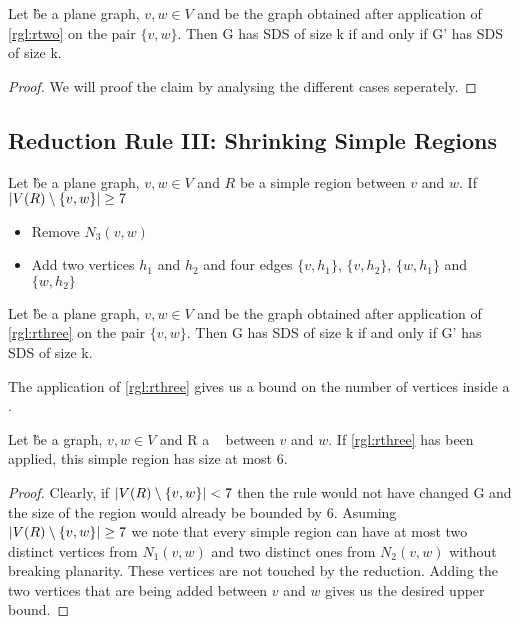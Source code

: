 \begin{lemma}
    Let \G be a plane graph, $v, w \in V$ and \GB be the graph obtained after application of \cref{rgl:rtwo} on the pair $\{v, w\}$. Then G has SDS of size k if and only if G' has SDS of size k.
\end{lemma}
\begin{proof}
   We will proof the claim by analysing the different cases seperately.
\end{proof}

\subsection{Reduction Rule III: Shrinking Simple Regions}
\begin{rgl}\label{rgl:rthree}
    Let \G be a plane graph, $v, w \in V$ and $R$ be a simple region between $v$ and $w$. If $\abs{V(R) \setminus \{v, w\}} \geq 7$
    \begin{itemize}
        \item Remove $N_3(v,w)$
        \item Add two vertices $h_1$ and $h_2$ and four edges $\{v, h_1\}$, $\{v, h_2\}$, $\{w, h_1\}$ and $\{w, h_2\}$
    \end{itemize}
\end{rgl}
\begin{lemma}
    Let \G be a plane graph, $v, w \in V$ and \GB be the graph obtained after application of \cref{rgl:rthree} on the pair $\{v, w\}$. Then G has SDS of size k if and only if G' has SDS of size k.
\end{lemma}

The application of \cref{rgl:rthree} gives us a bound on the number of vertices inside a \sr. 
\begin{corollary}
    Let \G be a graph, $v, w\in V$ and R a \sr~ between $v$ and $w$. If \cref{rgl:rthree} has been applied, this simple region has size at most 6.
\end{corollary}
\begin{proof}
    Clearly, if $\abs{V(R) \setminus \{v, w\}} < 7$ then the rule would not have changed G and the size of the region would already be bounded by 6.
    Asuming $\abs{V(R) \setminus \{v, w\}} \geq 7$ we note that every simple region can have at most two distinct vertices from $N_1(v,w)$ and two distinct ones from $N_2(v,w)$ without breaking planarity. These vertices are not touched by the reduction. Adding the two vertices that are being added between $v$ and $w$ gives us the desired upper bound.
\end{proof}

